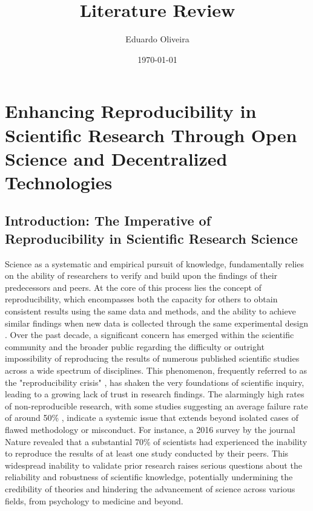\documentclass{article}
\title{Literature Review}
\author{Eduardo Oliveira}
\date{\today}
\begin{document}
\maketitle


\section{Enhancing Reproducibility in Scientific Research Through Open Science and Decentralized Technologies}

\subsection{Introduction: The Imperative of Reproducibility in Scientific Research Science}

Science as a systematic and empirical pursuit of knowledge, fundamentally relies on the ability of researchers to verify and build upon the findings of their predecessors and peers. At the core of this process lies the concept of reproducibility, which encompasses both the capacity for others to obtain consistent results using the same data and methods, and the ability to achieve similar findings when new data is collected through the same experimental design \cite{pellizzari_reproducibility_2017, committee_2019}. Over the past decade, a significant concern has emerged within the scientific community and the broader public regarding the difficulty or outright impossibility of reproducing the results of numerous published scientific studies across a wide spectrum of disciplines. This phenomenon, frequently referred to as the "reproducibility crisis" \cite{baker2016reproducibility}, has shaken the very foundations of scientific inquiry, leading to a growing lack of trust in research findings. The alarmingly high rates of non-reproducible research, with some studies suggesting an average failure rate of around 50\% \cite{branch_reproducibility_2019}, indicate a systemic issue that extends beyond isolated cases of flawed methodology or misconduct. For instance, a 2016 survey by the journal Nature revealed that a substantial 70\% of scientists had experienced the inability to reproduce the results of at least one study conducted by their peers. This widespread inability to validate prior research raises serious questions about the reliability and robustness of scientific knowledge, potentially undermining the credibility of theories and hindering the advancement of science across various fields, from psychology to medicine and beyond.
\end{document}

